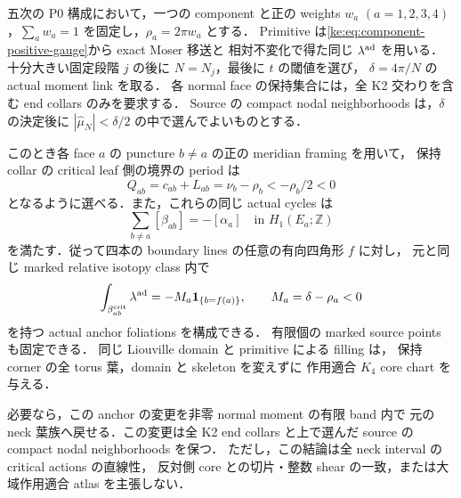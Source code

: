 \begin{corollary}
\label{ke:k4-actual-end-anchor}
五次の P0 構成において，一つの component と正の weights $w_a$
$(a=1,2,3,4)$，$\sum_aw_a=1$ を固定し，$\rho_a=2\pi w_a$ とする．
Primitive は\eqref{ke:eq:component-positive-gauge}から exact Moser 移送と
相対不変化で得た同じ $\lambda^{\rm ad}$ を用いる．
十分大きい固定段階 $j$ の後に $N=N_j$，最後に $t$ の閾値を選び，
$\delta=4\pi/N$ の actual moment link を取る．
各 normal face の保持集合には，全 K2 交わりを含む end collars のみを要求する．
Source の compact nodal neighborhoods は，$\delta$ の決定後に
$|\widehat\mu_N|<\delta/2$ の中で選んでよいものとする．

このとき各 face $a$ の puncture $b\ne a$ の正の meridian framing を用いて，
保持 collar の critical leaf 側の境界の period は
\[
 Q_{ab}=c_{ab}+L_{ab}
       =\nu_b-\rho_b<-\rho_b/2<0
\]
となるように選べる．また，これらの同じ actual cycles は
\[
 \sum_{b\ne a}[\beta_{ab}]=-[\alpha_a]
 \quad\text{in }H_1(E_a;\mathbb Z)
\]
を満たす．従って四本の boundary lines の任意の有向四角形 $f$ に対し，
元と同じ marked relative isotopy class 内で
\[
 \int_{\beta_{ab}^{\rm crit}}\lambda^{\rm ad}
   =-M_a\mathbf1_{\{b=f(a)\}},\qquad M_a=\delta-\rho_a<0
\]
を持つ actual anchor foliations を構成できる．
有限個の marked source points も固定できる．
同じ Liouville domain と primitive による filling は，
保持 corner の全 torus 葉，domain と skeleton を変えずに
作用適合 $K_4$ core chart を与える．

必要なら，この anchor の変更を非零 normal moment の有限 band 内で
元の neck 葉族へ戻せる．この変更は全 K2 end collars と上で選んだ
source の compact nodal neighborhoods を保つ．
ただし，この結論は全 neck interval の critical actions の直線性，
反対側 core との切片・整数 shear の一致，または大域作用適合 atlas を主張しない．
\end{corollary}

